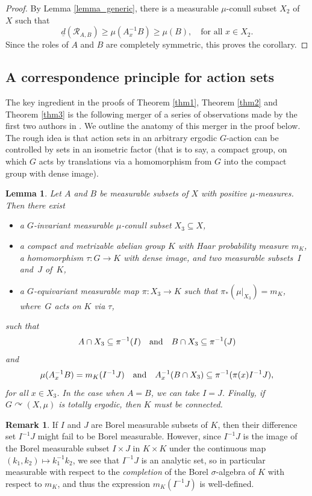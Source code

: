 \documentclass[JEP,XML,SOM,Unicode]{cedram}
\let\mathcal\mathscr
\newcommand{\cR}{\mathcal{R}}
\newcommand{\qand}{\quad\textup{and}\quad}
\let\acts\curvearrowright
\theoremstyle{plain}
\newtheorem{lemma}[theorem]{Lemma}
\theoremstyle{definition}
\newtheorem{remark}[theorem]{Remark}
\begin{document}
\begin{proof}
By Lemma \ref{lemma_generic}, there is a measurable $\mu$-conull subset $X_2$ of $X$ such that
\[
\underline{d}(\cR_{A,B}) \geq \mu(A_x^{-1}B) \geq \mu(B), \quad \textrm{for all $x \in X_2$}.
\]
Since the roles of $A$ and $B$ are completely symmetric, this proves the corollary.
\end{proof}

\subsection{A correspondence principle for action sets}

The key ingredient in the proofs of Theorem \ref{thm1}, Theorem \ref{thm2} and Theorem \ref{thm3} is the following merger of a series of
observations made by the first two authors in \cite{BF}. We outline the anatomy of this merger in the proof below. The rough idea is that
action sets in an arbitrary ergodic $G$-action can be controlled by sets in an isometric factor (that is to say, a compact group, on which $G$
acts by translations via a homomorphism from $G$ into the compact group with dense image).

\begin{lemma}
\label{corrprinciple}
Let $A$ and $B$ be measurable subsets of $X$ with positive $\mu$-measures. Then there exist

\begin{itemize}
\item a $G$-invariant measurable $\mu$-conull subset $X_3 \subseteq X$,
\item a compact and metrizable abelian group $K$ with Haar probability measure $m_K$, a homomorphism $\tau : G \to K$ with dense image,
and two measurable subsets~$I$ and~$J$ of~$K$,
\item a $G$-equivariant measurable map $\pi : X_3 \to K$ such that $\pi_*(\mu |_{X_3}) = m_K$, where~$G$ acts on $K$ via $\tau$,
\end{itemize}
such that
\[
A \cap X_3 \subseteq \pi^{-1}(I) \qand B \cap X_3 \subseteq \pi^{-1}(J)
\]
and
\[
\mu(A_x^{-1}B) = m_K(I^{-1}J)
\qand
A_x^{-1}(B \cap X_3) \subseteq \pi^{-1}(\pi(x) I^{-1}J),
\]
for all $x \in X_3$. In the case when $A = B$, we can take $I = J$. Finally, if $G \acts (X,\mu)$ is totally ergodic, then $K$ must be connected.
\end{lemma}

\begin{remark}
If $I$ and $J$ are Borel measurable subsets of $K$, then their difference set $I^{-1}J$ might fail to be Borel measurable. However, since
$I^{-1}J$ is the image of the Borel measurable subset $I \times J$ in $K \times K$ under the continuous map $(k_1,k_2) \mapsto k_1^{-1}k_2$,
we see that $I^{-1}J$ is an analytic set, so in particular measurable with respect to the \emph{completion} of the Borel $\sigma$-algebra of $K$ with
respect to $m_K$, and thus the expression $m_K(I^{-1}J)$ is well-defined.
\end{remark}
\end{document}
